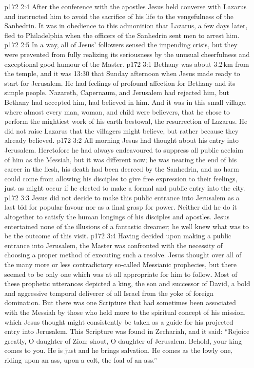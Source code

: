 \vs p172 2:4 After the conference with the apostles Jesus held converse with Lazarus and instructed him to avoid the sacrifice of his life to the vengefulness of the Sanhedrin. It was in obedience to this admonition that Lazarus, a few days later, fled to Philadelphia when the officers of the Sanhedrin sent men to arrest him.
\vs p172 2:5 In a way, all of Jesus’ followers sensed the impending crisis, but they were prevented from fully realizing its seriousness by the unusual cheerfulness and exceptional good humour of the Master.
\vs p172 3:1 Bethany was about 3.2\,km from the temple, and it was 13:30 that Sunday afternoon when Jesus made ready to start for Jerusalem. He had feelings of profound affection for Bethany and its simple people. Nazareth, Capernaum, and Jerusalem had rejected him, but Bethany had accepted him, had believed in him. And it was in this small village, where almost every man, woman, and child were believers, that he chose to perform the mightiest work of his earth bestowal, the resurrection of Lazarus. He did not raise Lazarus that the villagers might believe, but rather because they already believed.
\vs p172 3:2 All morning Jesus had thought about his entry into Jerusalem. Heretofore he had always endeavoured to suppress all public acclaim of him as the Messiah, but it was different now; he was nearing the end of his career in the flesh, his death had been decreed by the Sanhedrin, and no harm could come from allowing his disciples to give free expression to their feelings, just as might occur if he elected to make a formal and public entry into the city.
\vs p172 3:3 Jesus did not decide to make this public entrance into Jerusalem as a last bid for popular favour nor as a final grasp for power. Neither did he do it altogether to satisfy the human longings of his disciples and apostles. Jesus entertained none of the illusions of a fantastic dreamer; he well knew what was to be the outcome of this visit.
\vs p172 3:4 Having decided upon making a public entrance into Jerusalem, the Master was confronted with the necessity of choosing a proper method of executing such a resolve. Jesus thought over all of the many more or less contradictory so\hyp{}called Messianic prophecies, but there seemed to be only one which was at all appropriate for him to follow. Most of these prophetic utterances depicted a king, the son and successor of David, a bold and aggressive temporal deliverer of all Israel from the yoke of foreign domination. But there was one Scripture that had sometimes been associated with the Messiah by those who held more to the spiritual concept of his mission, which Jesus thought might consistently be taken as a guide for his projected entry into Jerusalem. This Scripture was found in Zechariah, and it said: “Rejoice greatly, O daughter of Zion; shout, O daughter of Jerusalem. Behold, your king comes to you. He is just and he brings salvation. He comes as the lowly one, riding upon an ass, upon a colt, the foal of an ass.”
